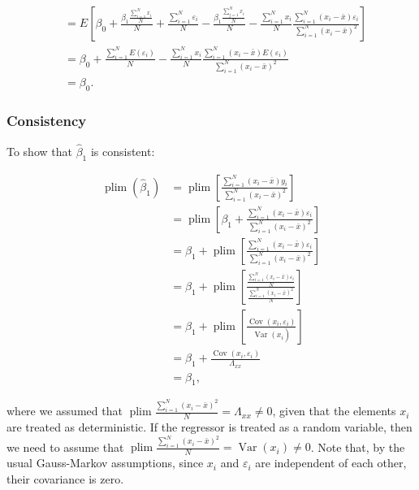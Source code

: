 $$
\begin{aligned}
& =E\left[\beta_{0}+\frac{\beta_{1} \frac{\sum_{i=1}^{N} x_{i}}{N}}{N}+\frac{\sum_{i=1}^{N} \varepsilon_{i}}{N}-\frac{\beta_{1} \frac{\sum_{j=1}^{N} x_{i}}{N}}{N}-\frac{\sum_{i=1}^{N} x_{i}}{N} \frac{\sum_{i=1}^{N}\left(x_{i}-\bar{x}\right) \varepsilon_{i}}{\sum_{i=1}^{N}\left(x_{i}-\bar{x}\right)^{2}}\right] \\
& =\beta_{0}+\frac{\sum_{i=1}^{N} E\left(\varepsilon_{i}\right)}{N}-\frac{\sum_{i=1}^{N} x_{i}}{N} \frac{\sum_{i=1}^{N}\left(x_{i}-\bar{x}\right) E\left(\varepsilon_{i}\right)}{\sum_{i=1}^{N}\left(x_{i}-\bar{x}\right)^{2}} \\
& =\beta_{0} .
\end{aligned}
$$

\subsubsection{Consistency}
To show that $\widehat{\beta}_{1}$ is consistent:

$$
\begin{aligned}
\operatorname{plim}\left(\widehat{\beta}_{1}\right) & =\operatorname{plim}\left[\frac{\sum_{i=1}^{N}\left(x_{i}-\bar{x}\right) y_{i}}{\sum_{i=1}^{N}\left(x_{i}-\bar{x}\right)^{2}}\right] \\
& =\operatorname{plim}\left[\beta_{1}+\frac{\sum_{i=1}^{N}\left(x_{i}-\bar{x}\right) \varepsilon_{i}}{\sum_{i=1}^{N}\left(x_{i}-\bar{x}\right)^{2}}\right] \\
& =\beta_{1}+\operatorname{plim}\left[\frac{\sum_{i=1}^{N}\left(x_{i}-\bar{x}\right) \varepsilon_{i}}{\sum_{i=1}^{N}\left(x_{i}-\bar{x}\right)^{2}}\right] \\
& =\beta_{1}+\operatorname{plim}\left[\frac{\frac{\sum_{i=1}^{N}\left(x_{i}-\bar{x}\right) \varepsilon_{i}}{N}}{\frac{\sum_{i=1}^{N}\left(x_{i}-\bar{x}\right)^{2}}{N}}\right] \\
& =\beta_{1}+\operatorname{plim}\left[\frac{\operatorname{Cov}\left(x_{i}, \varepsilon_{i}\right)}{\left.\widehat{\operatorname{Var}\left(x_{i}\right.}\right)}\right] \\
& =\beta_{1}+\frac{\operatorname{Cov}\left(x_{i}, \varepsilon_{i}\right)}{\Lambda_{x x}} \\
& =\beta_{1},
\end{aligned}
$$

where we assumed that $\operatorname{plim} \frac{\sum_{i=1}^{N}\left(x_{i}-\bar{x}\right)^{2}}{N}=\Lambda_{x x} \neq 0$, given that the elements $x_{i}$ are treated as deterministic. If the regressor is treated as a random variable, then we need to assume that $\operatorname{plim} \frac{\sum_{i=1}^{N}\left(x_{i}-\bar{x}\right)^{2}}{N}=\operatorname{Var}\left(x_{i}\right) \neq 0$. Note that, by the usual Gauss-Markov assumptions, since $x_{i}$ and $\varepsilon_{i}$ are independent of each other, their covariance is zero.

